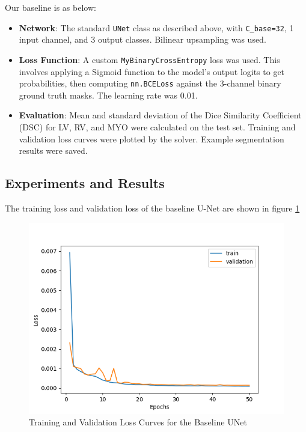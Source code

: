 \documentclass{article}
\begin{document}
Our baseline is as below:
\begin{itemize}
    \item \textbf{Network}: The standard \texttt{UNet} class as described above, with \texttt{C\_base=32}, 1 input channel, 
    and 3 output classes. Bilinear upsampling was used.
    \item \textbf{Loss Function}: A custom \texttt{MyBinaryCrossEntropy} loss was used. This involves applying a Sigmoid 
    function to the model's output logits to get probabilities, then computing \texttt{nn.BCELoss} against the 3-channel 
    binary ground truth masks. The learning rate was 0.01.
    \item \textbf{Evaluation}: Mean and standard deviation of the Dice Similarity Coefficient (DSC) for LV, RV, and MYO 
    were calculated on the test set. Training and validation loss curves were plotted by the solver. 
    Example segmentation results were saved.
\end{itemize}

\subsection{Experiments and Results}
The training loss and validation loss of the baseline U-Net are shown in figure \ref{fig:baseline_unet_loss}
\begin{figure}[H]
  \centering
  \includegraphics[width=\linewidth]{../result/baseline_unet.png}
  \caption{Training and Validation Loss Curves for the Baseline UNet}
  \label{fig:baseline_unet_loss}
\end{figure}
\end{document}
